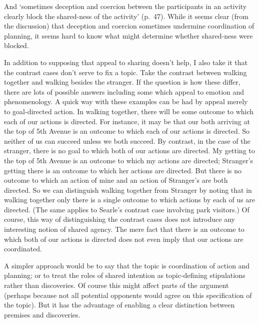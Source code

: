 \documentclass[12pt,letterpaper]{extarticle}
\begin{document}
And `sometimes deception and coercion between the participants in an activity clearly block the shared-ness of the activity' (p.\ 47).
While it seems clear (from the discussion) that deception and coercion sometimes undermine coordination of planning, it seems hard to know what might determine whether shared-ness were blocked.

In addition to supposing that appeal to sharing doesn't help, 
I also take it that the contrast cases don't serve to fix a topic.
Take the contrast between walking together and walking besides the stranger.
If the question is how these differ, there are lots of possible answers including some which appeal to emotion and phenomenology.
A quick way with these examples can be had by appeal merely to goal-directed action.
In walking together, there will be some outcome to which each of our actions is directed.
For instance, it may be that our both arriving at the top of 5th Avenue is an outcome to which each of our actions is directed.
So neither of us can succeed unless we both succeed.
By contrast, in the case of the stranger, there is no goal to which both of our actions are directed.
My getting to the top of 5th Avenue is an outcome to which my actions are directed; Stranger's getting there is an outcome to which her actions are directed.
But there is no outcome to which an action of mine and an action of Stranger's are both directed.
So we can distinguish walking together from Stranger by noting that in walking together only there is a single outcome to which actions by each of us are directed.
(The same applies to Searle's contrast case involving park visitors.)
Of course, this way of distinguishing the contrast cases does not introduce any interesting notion of shared agency.
The mere fact that there is an outcome to which both of our actions is directed does not even imply that our actions are coordinated.

A simpler approach would be to say that the topic is coordination of action and planning; or to treat the roles of shared intention as topic-defining stipulations rather than discoveries.
Of course this might affect parts of the argument (perhaps because not all potential opponents would agree on this specification of the topic).
But it has the advantage of enabling a clear distinction between premises and discoveries.
\end{document}
